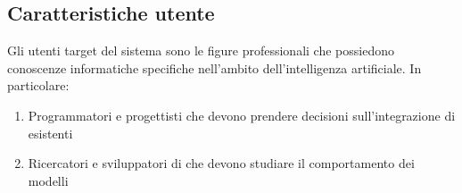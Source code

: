 
\subsection{Caratteristiche utente}
Gli utenti target del sistema sono le figure professionali che possiedono conoscenze informatiche specifiche nell'ambito dell'intelligenza artificiale.
In particolare:
\begin{enumerate}
    \item Programmatori e progettisti che devono prendere decisioni sull'integrazione di  esistenti
    \item Ricercatori e sviluppatori di  che devono studiare il comportamento dei modelli
\end{enumerate}  
